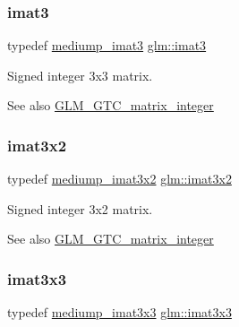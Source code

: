 \subsubsection{\texorpdfstring{imat3}{imat3}}
{\footnotesize\ttfamily typedef \hyperlink{group__gtc__matrix__integer_gac6ab7a5cfe157ba8deb79a7691ad8263}{mediump\+\_\+imat3} \hyperlink{group__gtc__matrix__integer_ga45481922dd07a3a8e23758286311ee97}{glm\+::imat3}}

Signed integer 3x3 matrix. \begin{DoxySeeAlso}{See also}
\hyperlink{group__gtc__matrix__integer}{G\+L\+M\+\_\+\+G\+T\+C\+\_\+matrix\+\_\+integer} 
\end{DoxySeeAlso}
\mbox{\label{group__gtc__matrix__integer_ga04deef94cdfdd3b3b2706e10a32ef7f3}} 
\subsubsection{\texorpdfstring{imat3x2}{imat3x2}}
{\footnotesize\ttfamily typedef \hyperlink{group__gtc__matrix__integer_gae3f0a14fb81eb2edc0caf5b131adb969}{mediump\+\_\+imat3x2} \hyperlink{group__gtc__matrix__integer_ga04deef94cdfdd3b3b2706e10a32ef7f3}{glm\+::imat3x2}}

Signed integer 3x2 matrix. \begin{DoxySeeAlso}{See also}
\hyperlink{group__gtc__matrix__integer}{G\+L\+M\+\_\+\+G\+T\+C\+\_\+matrix\+\_\+integer} 
\end{DoxySeeAlso}
\mbox{\label{group__gtc__matrix__integer_gaeff9ef8f56cccc828d6b897923e75402}} 
\subsubsection{\texorpdfstring{imat3x3}{imat3x3}}
{\footnotesize\ttfamily typedef \hyperlink{group__gtc__matrix__integer_ga1304a2da9c3f5937aa8c4684d638d09c}{mediump\+\_\+imat3x3} \hyperlink{group__gtc__matrix__integer_gaeff9ef8f56cccc828d6b897923e75402}{glm\+::imat3x3}}

